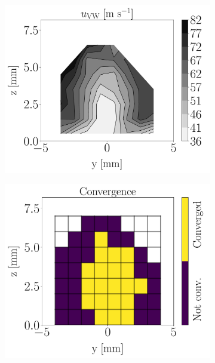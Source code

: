 \begin{figure}[h!]
\begin{subfigure}[b]{0.2\textwidth}
\end{subfigure}
\hspace*{0.45in}
\begin{subfigure}[b]{0.2\textwidth}
	\flushleft
   \includegraphics[scale=0.19]{./part2_developments/figures_ch6_lagrangian_JICF/injectors_SLI/uG100_dx10_x05_ux_mean_vw_map}
\end{subfigure}
\hspace*{0.45in}
\begin{subfigure}[b]{0.2\textwidth}
	\flushleft
   \includegraphics[scale=0.19]{./part2_developments/figures_ch6_lagrangian_JICF/injectors_SLI/uG100_dx10_x05_convergence_map} 
\end{subfigure}


\end{figure}
